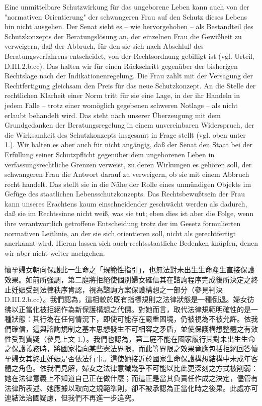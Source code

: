 \documentclass[12pt]{article}
\begin{document}
\begin{sourcepara}[title={原文SondervotumMS.301}]
Eine unmittelbare Schutzwirkung für das ungeborene Leben kann auch von der "normativen Orientierung" der schwangeren Frau auf den Schutz dieses Lebens hin nicht ausgehen. Der Senat sieht es -- wie hervorgehoben -- als Bestandteil des Schutzkonzepts der Beratungslösung an, der einzelnen Frau die Gewißheit zu verweigern, daß der Abbruch, für den sie sich nach Abschluß des Beratungsverfahrens entscheidet, von der Rechtsordnung gebilligt ist (vgl. Urteil, D.III.2.b.cc). Das halten wir für einen Rückschritt gegenüber der bisherigen Rechtslage nach der Indikationenregelung. Die Frau zahlt mit der Versagung der Rechtfertigung gleichsam den Preis für das neue Schutzkonzept. An die Stelle der rechtlichen Klarheit einer Norm tritt für sie eine Lage, in der ihr Handeln in jedem Falle -- trotz einer womöglich gegebenen schweren Notlage -- als nicht erlaubt behandelt wird. Das steht nach unserer Überzeugung mit dem Grundgedanken der Beratungsregelung in einem unvereinbaren Widerspruch, der die Wirksamkeit des Schutzkonzepts insgesamt in Frage stellt (vgl. oben unter 1.). Wir halten es aber auch für nicht angängig, daß der Senat den Staat bei der Erfüllung seiner Schutzpflicht gegenüber dem ungeborenen Leben in verfassungsrechtliche Grenzen verweist, zu deren Wirkungen es gehören soll, der schwangeren Frau die Antwort darauf zu verweigern, ob sie mit einem Abbruch recht handelt. Das stellt sie in die Nähe der Rolle eines unmündigen Objekts im Gefüge des staatlichen Lebensschutzkonzepts. Das Rechtsbewußtsein der Frau kann unseres Erachtens kaum einschneidender geschwächt werden als dadurch, daß sie im Rechtssinne nicht weiß, was sie tut; eben dies ist aber die Folge, wenn ihre verantwortlich getroffene Entscheidung trotz der im Gesetz formulierten normativen Leitlinie, an der sie sich orientieren soll, nicht als gerechtfertigt anerkannt wird. Hieran lassen sich auch rechtsstaatliche Bedenken knüpfen, denen wir aber nicht weiter nachgehen.
\end{sourcepara}
\begin{transpara}
懷孕婦女朝向保護此一生命之「規範性指引」，也無法對未出生生命產生直接保護效果。如前所強調，第二庭將拒絕使個別婦女確信其在諮詢程序完成後所決定之終止妊娠受到法律秩序肯認，視為諮詢方案保護構想之一部分（參見判決 D.III.2.b.cc）。我們認為，這相較於既有指標規則之法律狀態是一種倒退。婦女彷彿以正當化被拒絕作為新保護構想之代價。對她而言，取代法律規範明確性的是一種狀態：其行為在任何情況下，即使可能存在嚴重困境，仍被視為不被允許。依我們確信，這與諮詢規制之基本思想發生不可相容之矛盾，並使保護構想整體之有效性受到質疑（參見上文 1.）。我們也認為，第二庭不能在國家履行其對未出生生命之保護義務時，將國家指向某些憲法界限，而此等界限之效果竟應包括拒絕回答懷孕婦女其終止妊娠是否依法行事。這使她接近於國家生命保護構想結構中未成年客體之角色。依我們見解，婦女之法律意識幾乎不可能以比此更深刻之方式被削弱：她在法律意義上不知道自己正在做什麼；而這正是當其負責任作成之決定，儘管有法律所表述、她應據以取向之規範準則，卻不被承認為正當化時之後果。此處亦可連結法治國疑慮，但我們不再進一步追究。
\end{transpara}
\end{document}
